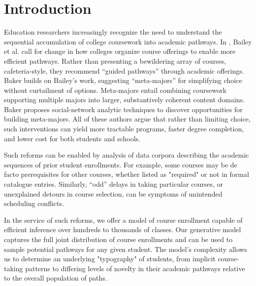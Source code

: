 \documentclass{edm_template}
\begin{document}
\section{Introduction}

Education researchers increasingly recognize the need to understand the sequential accumulation of college coursework into academic pathways. In \cite{bailey2015redesigning, scott2011shapeless}, Bailey et al. call for change in how colleges organize course offerings to enable more efficient pathways. Rather than presenting a bewildering array of courses, cafeteria-style, they recommend ``guided pathways'' through academic offerings. Baker \cite{Baker2018} builds on Bailey's work, suggesting ``meta-majors'' for simplifying choice without curtailment of options. Meta-majors entail combining coursework supporting multiple majors into larger, substantively coherent content domains. Baker proposes social-network analytic
techniques to discover opportunities for building meta-majors. All of these authors argue that rather than limiting choice,
such interventions can yield more tractable programs, faster degree completion, and lower cost for both students and schools.

Such reforms can be enabled by analysis of data corpora describing the academic sequences of prior student enrollments. For example, some courses may be de facto prerequisites for other courses, whether listed as "required" or not in formal catalogue entries. Similarly, ``odd'' delays in taking particular courses, or unexplained detours in course selection, can be symptoms of unintended scheduling conflicts. 

In the service of such reforms, we offer a model of course enrollment capable of efficient inference over hundreds to thousands of classes. Our generative model captures the full joint distribution of course enrollments and can be used to sample potential pathways for any given student. The model's complexity allows us to determine an underlying "typography" of students, from implicit course-taking patterns to differing levels of novelty in their academic pathways relative to the overall population of paths. 
\end{document}
